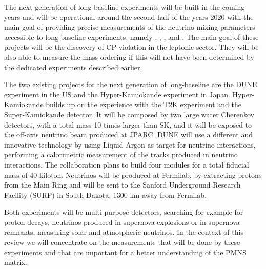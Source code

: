 The next generation of long-baseline experiments will be built in the coming years and will be operational around the second half of the years 2020 with the main goal of providing precise measurements of the neutrino mixing parameters accessible to long-baseline experiments, namely \thatm, \thint, \dmsq, and \dcp. 
The main goal of these projects will be the discovery of CP violation in the leptonic sector. They will be also able to measure the mass ordering if this will not have been determined by the dedicated experiments described earlier. 

The two existing projects for the next generation of long-baseline are the DUNE experiment in the US and the Hyper-Kamiokande experiment in Japan. Hyper-Kamiokande builds up on the experience with the T2K experiment and the Super-Kamiokande detector. It will be composed by two large water Cherenkov detectors, with a total mass 10 times larger than SK, and it will be exposed to the off-axis neutrino beam produced at JPARC. 
DUNE will use a different and innovative technology by using Liquid Argon as target for neutrino interactions, performing a calorimetric measurement of the tracks produced in neutrino interactions. The collaboration plans to build four modules for a total fiducial mass of 40 kiloton. Neutrinos will be produced at Fermilab, by extracting protons from the Main Ring and will be sent to the Sanford Underground Research Facility (SURF) in South Dakota, 1300 km away from Fermilab.

Both experiments will be multi-purpose detectors, searching for example for proton decays, neutrinos produced in supernova explosions or in supernova remnants, measuring solar and atmospheric neutrinos. In the context of this review we will concentrate on the measurements that will be done by these experiments and that are important for a better understanding of the PMNS matrix.

